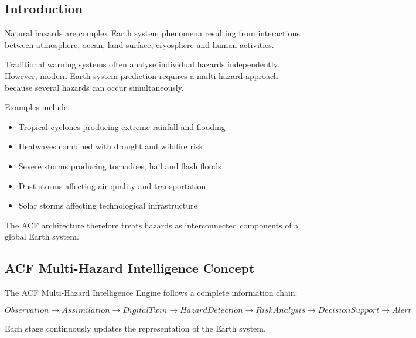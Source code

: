 
\subsection{Introduction}

Natural hazards are complex Earth system phenomena resulting from
interactions between atmosphere, ocean, land surface, cryosphere and
human activities.

Traditional warning systems often analyse individual hazards
independently. However, modern Earth system prediction requires a
multi-hazard approach because several hazards can occur simultaneously.

Examples include:

\begin{itemize}

\item Tropical cyclones producing extreme rainfall and flooding

\item Heatwaves combined with drought and wildfire risk

\item Severe storms producing tornadoes, hail and flash floods

\item Dust storms affecting air quality and transportation

\item Solar storms affecting technological infrastructure

\end{itemize}

The ACF architecture therefore treats hazards as interconnected
components of a global Earth system.


\subsection{ACF Multi-Hazard Intelligence Concept}

The ACF Multi-Hazard Intelligence Engine follows a complete information
chain:

\[
Observation
\rightarrow
Assimilation
\rightarrow
Digital Twin
\rightarrow
Hazard Detection
\rightarrow
Risk Analysis
\rightarrow
Decision Support
\rightarrow
Alert
\]

Each stage continuously updates the representation of the Earth system.


